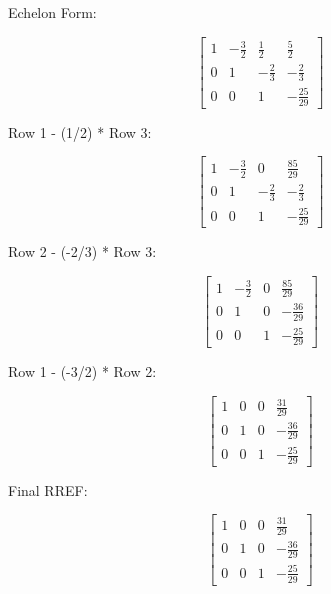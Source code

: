 \documentclass{article}
\begin{document}
Echelon Form:

\[ \left[\begin{matrix}1 & - \frac{3}{2} & \frac{1}{2} & \frac{5}{2}\\0 & 1 & - \frac{2}{3} & - \frac{2}{3}\\0 & 0 & 1 & - \frac{25}{29}\end{matrix}\right] \]

Row 1 - (1/2) * Row 3:

\[ \left[\begin{matrix}1 & - \frac{3}{2} & 0 & \frac{85}{29}\\0 & 1 & - \frac{2}{3} & - \frac{2}{3}\\0 & 0 & 1 & - \frac{25}{29}\end{matrix}\right] \]

Row 2 - (-2/3) * Row 3:

\[ \left[\begin{matrix}1 & - \frac{3}{2} & 0 & \frac{85}{29}\\0 & 1 & 0 & - \frac{36}{29}\\0 & 0 & 1 & - \frac{25}{29}\end{matrix}\right] \]

Row 1 - (-3/2) * Row 2:

\[ \left[\begin{matrix}1 & 0 & 0 & \frac{31}{29}\\0 & 1 & 0 & - \frac{36}{29}\\0 & 0 & 1 & - \frac{25}{29}\end{matrix}\right] \]

Final RREF:

\[ \left[\begin{matrix}1 & 0 & 0 & \frac{31}{29}\\0 & 1 & 0 & - \frac{36}{29}\\0 & 0 & 1 & - \frac{25}{29}\end{matrix}\right] \]
\end{document}
